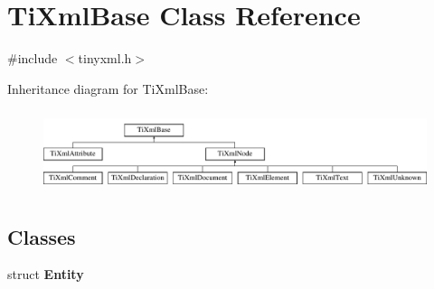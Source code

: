 \hypertarget{classTiXmlBase}{\section{\-Ti\-Xml\-Base \-Class \-Reference}
\label{classTiXmlBase}
}


{\ttfamily \#include $<$tinyxml.\-h$>$}

\-Inheritance diagram for \-Ti\-Xml\-Base\-:\begin{figure}[H]
\begin{center}
\leavevmode
\includegraphics[height=2.413793cm]{classTiXmlBase}
\end{center}
\end{figure}
\subsection*{\-Classes}
\begin{DoxyCompactItemize}
\item 
struct {\bfseries \-Entity}
\end{DoxyCompactItemize}

